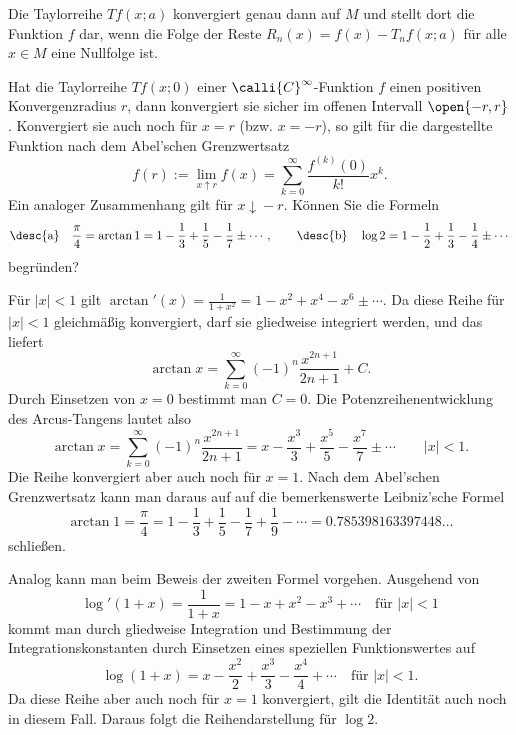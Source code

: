 \begin{antwort}
  Die Taylorreihe $Tf(x;a)$ 
  konvergiert genau dann auf $M$ und stellt dort die Funktion $f$ dar, 
  wenn die Folge der Reste $R_n(x) = f(x)-T_nf(x;a)$ 
  für alle $x\in M$ eine Nullfolge ist. 
  \AntEnd
\end{antwort}

\begin{frage}
  Hat die Taylorreihe $T f(x;0)$ einer $\calli{C}^\infty$-Funktion $f$ 
  einen positiven Konvergenzradius $r$, dann konvergiert sie sicher im 
  offenen Intervall $\open{-r,r}$. Konvergiert sie auch noch 
  für $x=r$ (bzw. $x=-r$), so gilt für die dargestellte Funktion nach dem 
  Abel'schen Grenzwertsatz 
  \[
  f(r) := \lim_{x\uparrow r} f(x)=\sum_{k=0}^\infty \frac{f^{(k)}(0)}{k!} x^k.
  \]
  Ein analoger Zusammenhang gilt für $x\!\downarrow\!-r$.  
  Können Sie die Formeln 
  \[
  \text{\desc{a}}\quad
  \frac{\pi}{4} = \arctan 1 = 1-\frac{1}{3}+\frac{1}{5} - \frac{1}{7}\pm \cdots,
  \qquad\text{\desc{b}}\quad
  \log 2 = 1-\frac{1}{2}+\frac{1}{3}-\frac{1}{4} \pm \cdots
  \]
  begründen?
\end{frage} 

\begin{antwort}
   Für $|x|<1$ gilt 
  $\arctan'(x)=\frac{1}{1+x^2} = 1-x^2+x^4-x^6 \pm \cdots$. 
  Da diese Reihe für $|x|<1$ gleichmäßig konvergiert, 
  darf sie gliedweise integriert werden, und das liefert
  \[
  \arctan x = \sum_{k=0}^\infty (-1)^n \frac{x^{2n+1}}{2n+1} + C.
  \]
  Durch Einsetzen von $x=0$ 
  bestimmt man $C=0$. 
  Die Potenzreihenentwicklung des Arcus-Tangens lautet also   
  \[
  \arctan x = \sum_{k=0}^\infty (-1)^n \frac{x^{2n+1}}{2n+1} = 
  x-\frac{x^3}{3} +  \frac{x^5}{5} - \frac{x^7}{7} \pm \cdots
  \qquad |x|<1. 
  \]
  Die Reihe konvergiert aber auch noch für $x=1$. 
  Nach dem Abel'schen Grenzwertsatz kann man daraus auf auf die bemerkenswerte 
  Leibniz'sche Formel 
  \[
  \boxed{
    \arctan 1 = \frac{\pi}{4} = 
    1-\frac{1}{3}+\frac{1}{5} - \frac{1}{7} + \frac{1}{9} - \cdots 
    = 0.785398163397448\ldots
  }
  \]
  schließen. 

  \medskip\noindent
   Analog kann man beim Beweis der zweiten Formel vorgehen. 
  Ausgehend von 
  \[
  \log' (1+x)= \frac{1}{1+x} = 1- x + x^2 
  - x^3 + \cdots 
  \quad\text{für $|x|<1$}
  \]
  kommt man durch gliedweise Integration 
  und Bestimmung der Integrationskonstanten durch Einsetzen eines 
  speziellen Funktionswertes auf
  \[
  \log(1+x)=x-\frac{x^2}{2} + \frac{x^3}{3} - \frac{x^4}{4} + \cdots
  \quad\text{für $|x|<1$}.
  \]
  Da diese Reihe aber auch noch für $x=1$ konvergiert, 
  gilt die Identität auch noch in diesem Fall. Daraus folgt die 
  Reihendarstellung für $\log 2$. \AntEnd
\end{antwort}

